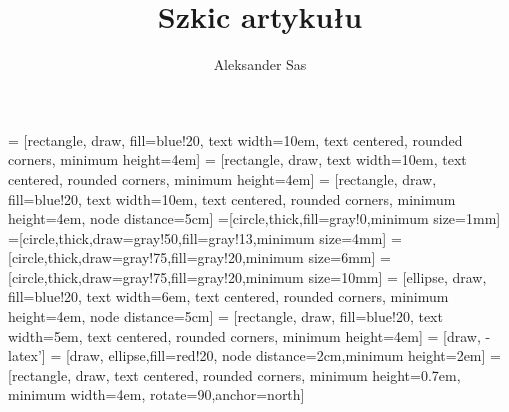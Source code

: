 \documentclass[11pt]{article}
\author{Aleksander Sas}
\title{Szkic artykułu}
\begin{document}
 = [rectangle, draw, fill=blue!20, text width=10em, text centered, rounded corners, minimum height=4em]
 = [rectangle, draw, text width=10em, text centered, rounded corners, minimum height=4em]
 = [rectangle, draw, fill=blue!20, text width=10em, text centered, rounded corners, minimum height=4em, node distance=5cm]
=[circle,thick,fill=gray!0,minimum size=1mm]
=[circle,thick,draw=gray!50,fill=gray!13,minimum size=4mm]
=[circle,thick,draw=gray!75,fill=gray!20,minimum size=6mm]
=[circle,thick,draw=gray!75,fill=gray!20,minimum size=10mm]
 = [ellipse, draw, fill=blue!20, text width=6em, text centered, rounded corners, minimum height=4em, node distance=5cm]
 = [rectangle, draw, fill=blue!20, text width=5em, text centered, rounded corners, minimum height=4em]
 = [draw, -latex']
 = [draw, ellipse,fill=red!20, node distance=2cm,minimum height=2em]
 = [rectangle, draw, text centered, rounded corners, minimum height=0.7em, minimum width=4em, rotate=90,anchor=north]
\maketitle
\tableofcontents
\end{document}
